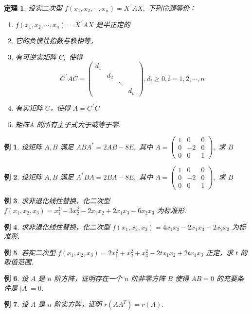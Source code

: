 \documentclass[13pt]{beamer}
\newtheorem{thm}{定理}
\newtheorem{exa}{例}
\begin{document}
\begin{frame}
\begin{thm}
设实二次型 $f\left(x_{1}, x_{2}, \cdots, x_{n}\right)=X^{\,\prime} A X,$ 下列命题等价：
\begin{enumerate}
	\item $f\left(x_{1}, x_{2}, \cdots, x_{n}\right)=X^{\, \prime} A X$ 是半正定的
	\item 它的负惯性指数与秩相等，
	\item 有可逆实矩阵 $C,$ 使得
\[
C^{\, \prime} A C=\left(\begin{array}{cccc}
d_{1} & & & \\
& d_{2} & & \\
& & \ddots & \\
& & & d_{n}
\end{array}\right), d_{i} \geq 0, i=1,2, \cdots, n
\]
	\item 有实矩阵 $C$，使得 $A=C^{\, \prime} C$
 	\item 矩阵$A$ 的所有主子式大于或等于零.
\end{enumerate}
\end{thm}
\end{frame}


\setcounter{exa}{0}
\begin{frame}
\begin{exa}
设矩阵 $A, B$ 满足 $A B A^{*}=2 A B-8 E,$ 其中 $A=\left(\begin{array}{ccc}1 & 0 & 0 \\ 0 & -2 & 0 \\ 0 & 0 & 1\end{array}\right),$ 求 $B$
\end{exa}

\begin{exa}
设矩阵 $A, B$ 满足 $A^{*} B A=2 B A-8 E,$ 其中 $A=\left(\begin{array}{ccc}1 & 0 & 0 \\ 0 & -2 & 0 \\ 0 & 0 & 1\end{array}\right),$ 求 $B$
\end{exa}
\end{frame}


\begin{frame}
\begin{exa}
求非退化线性替换，化二次型 $f\left(x_{1}, x_{2}, x_{3}\right)=x_{1}^{2}-3 x_{2}^{2}-2 x_{1} x_{2}+2 x_{1} x_{3}-6 x_{2} x_{3}$ 为标准形.
\end{exa}
\begin{exa}
求非退化线性替换，化二次型 $f\left(x_{1}, x_{2}, x_{3}\right)=4 x_{1} x_{2}-2 x_{1} x_{3}-2 x_{2} x_{3}$ 为标准形.
\end{exa}

\begin{exa}
若实二次型 $f\left(x_{1}, x_{2}, x_{3}\right)=2 x_{1}^{2}+x_{2}^{2}+x_{3}^{2}-2 t x_{1} x_{2}+2 t x_{1} x_{3}$ 正定，求 $t$ 的取值范围.
\end{exa}
\end{frame}

\begin{frame}
\begin{exa}
设 $A$ 是 $n$ 阶方阵，证明存在一个 $n$ 阶非零方阵 $B$ 使得 $A B=0$ 的充要条件是 $|A|=0$.
\end{exa}

\begin{exa}
设 $A$ 是 $n$ 阶实方阵，证明 $r\left(A A^{T}\right)=r(A)$.
\end{exa}
\end{frame}
\end{document}

